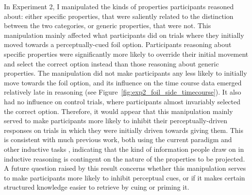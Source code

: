 In Experiment 2, I manipulated the kinds of properties participants reasoned about:
either specific properties, that were saliently related
to the distinction between the two categories,
or generic properties, that were not.
This manipulation mainly affected what participants did
on trials where they initially moved towards a perceptually-cued foil option.
Participants reasoning about specific properties were
significantly more likely to override their initial movement
and select the correct option instead
than those reasoning about generic properties.
The manipulation did not make participants any less likely
to initially move towards the foil option,
and its influence on the time course data
emerged relatively late in reasoning (see Figure~\ref{fig:exp2_foil_side_timecourse}).
It also had no influence on control trials,
where participants almost invariably selected the correct option.
Therefore, it would appear that this manipulation
mainly served to make participants more likely
to inhibit their perceptually-driven responses
on trials in which they were initially driven towards giving them.
This is consistent with much previous work,
both using the current paradigm \citep{Gelman2013c}
and other inductive tasks \citep{Heit1994,Ross1999},
indicating that the kind of information people draw on in inductive reasoning
is contingent on the nature of the properties to be projected.
A future question raised by this result concerns
whether this manipulation serves to make
participants more likely to inhibit perceptual cues,
or if it makes certain structured knowledge
easier to retrieve by cuing or priming it.

